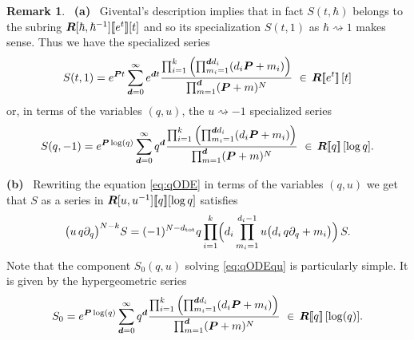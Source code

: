 \documentclass[twoside,leqno]{article}
\numberwithin{equation}{section}
\theoremstyle{plain}
\theoremstyle{definition}
\newtheorem{remark}[equation]{Remark}
\begin{document}
\begin{remark} \label{rem:qODE}
\ {\bfseries (a)}  \ Givental's description implies that in fact 
$S(t,\hbar)$ belongs to the subring $\boldsymbol{R}[\hbar,\hbar^{-1}][\![e^t]\!][t]$ and so its specialization $S(t,1)$ as $\hbar\rightsquigarrow 1$ makes sense. Thus we have the specialized series 
\[
S(t,1) = e^{\boldsymbol{P} t}\sum_{{\boldsymbol{d}}=0}^\infty e^{\boldsymbol{d} t} \frac{\prod_{i=1}^k \left(\prod_{m_i=1}^{\boldsymbol{d} d_i}(d_i \boldsymbol{P} +m_i)\right)}{\prod_{m=1}^{\boldsymbol{d}} (\boldsymbol{P} +m)^N} \ \in \, \boldsymbol{R}[\![e^t]\!]\,[t] 
\]
or, in terms of the variables $(q,u)$, the $u\rightsquigarrow -1$ specialized series 
\[
S(q,-1) = e^{\boldsymbol{P}\log(q)}\sum_{{\boldsymbol{d}}=0}^\infty q^{\boldsymbol{d}} \frac{\prod_{i=1}^k \left(\prod_{m_i=1}^{{\boldsymbol{d}} d_i}(d_i \boldsymbol{P} +m_i)\right)}{\prod_{m=1}^{\boldsymbol{d}} (\boldsymbol{P}+m)^N} \ \in \, \boldsymbol{R}[\![q]\!]\,[\log q].
\]

\noindent
{\bfseries (b)} \ Rewriting the equation \eqref{eq:qODE} in terms of the variables $(q,u)$ we get that $S$ as a series in $\boldsymbol{R}[u,u^{-1}][\![q]\!][\log q]$ satisfies 
\begin{equation} \label{eq:qODEqu}
    \bigl(u\, q \partial_q\bigr)^{N-k} S= (-1)^{N-d_{\operatorname{tot}}}
    q \prod_{i=1}^k\Bigl(d_i\prod_{m_i=1}^{d_i-1} u\bigl(d_i\, q\partial_q+m_i\bigr) \Bigr)\,S. 
\end{equation}
Note that the component $S_{0}(q,u)$ solving \eqref{eq:qODEqu} is particularly simple. 
It is given by the hypergeometric series
\[
S_{0} = e^{\boldsymbol{P}\log(q)}\sum_{{\boldsymbol{d}}=0}^\infty q^{\boldsymbol{d}} \frac{\prod_{i=1}^k \left(\prod_{m_i=1}^{{\boldsymbol{d}} d_i}(d_i \boldsymbol{P}+m_i)\right)}{\prod_{m=1}^{\boldsymbol{d}} (\boldsymbol{P}+m)^N} \ \in \, \boldsymbol{R}[\![q]\!]\,[\log (q)].
\]
\end{remark}
\end{document}

